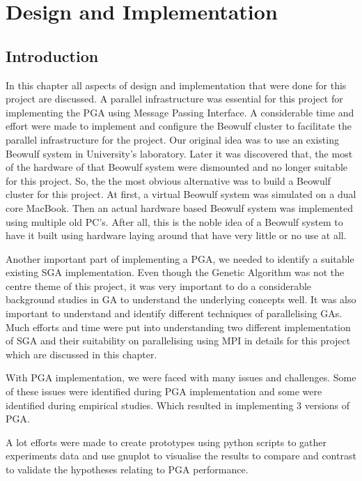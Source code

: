 \chapter{Design and Implementation}

\section{Introduction}
In this chapter all aspects of design and implementation that were done for this project are discussed. A parallel infrastructure was essential for this project for implementing the PGA using Message Passing Interface. A considerable time and effort were made to implement and configure the Beowulf cluster to facilitate the parallel infrastructure for the project. Our original idea was to use an existing Beowulf system in University's laboratory. Later it was discovered that, the most of the hardware of that Beowulf system were dismounted and no longer suitable for this project. So, the the most obvious alternative was to build a Beowulf cluster for this project. At first, a virtual Beowulf system was simulated on a dual core MacBook. Then an actual hardware based Beowulf system was implemented using multiple old PC's. After all, this is the noble idea of a Beowulf system to have it built using hardware laying around  that have very little or no use at all.

Another important part of implementing a PGA, we needed to identify a suitable existing SGA implementation. Even though the Genetic Algorithm was not the centre theme of this project, it was very important to do a considerable background studies in GA to understand the underlying concepts well. It was also important to understand and identify different techniques of parallelising GAs. Much efforts and time were put into understanding two different implementation of SGA and their suitability on parallelising using MPI in details for this project which are discussed in this chapter.

With PGA implementation, we were faced with many issues and challenges. Some of these issues were identified during PGA implementation and some were identified during empirical studies. Which resulted in implementing 3 versions of PGA. 

A lot efforts were made to create prototypes using python scripts to gather experiments data and use gnuplot to visualise the results to compare and contrast to validate the hypotheses relating to PGA performance.







